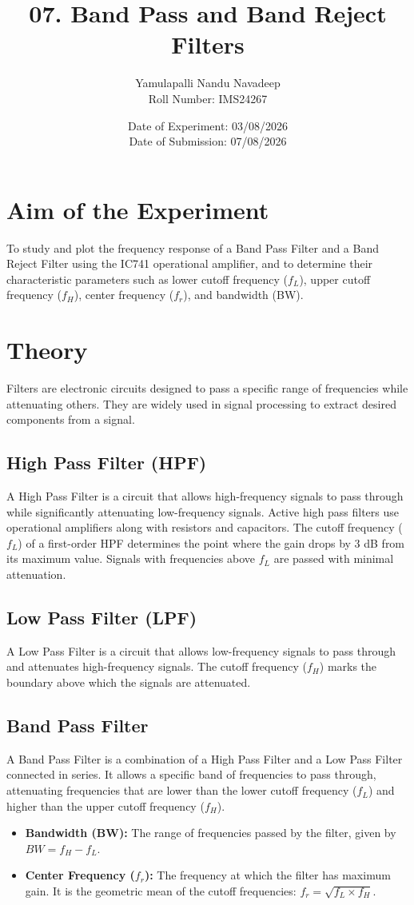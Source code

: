 \documentclass[12pt,a4paper]{article}
\title{\textbf{07. Band Pass and Band Reject Filters}}
\author{Yamulapalli Nandu Navadeep \\ Roll Number: IMS24267}
\date{Date of Experiment: 03/08/2026 \\ Date of Submission: 07/08/2026}
\begin{document}
\maketitle

\section{Aim of the Experiment}
To study and plot the frequency response of a Band Pass Filter and a Band Reject Filter using the IC741 operational amplifier, and to determine their characteristic parameters such as lower cutoff frequency ($f_L$), upper cutoff frequency ($f_H$), center frequency ($f_r$), and bandwidth (BW).

\section{Theory}
Filters are electronic circuits designed to pass a specific range of frequencies while attenuating others. They are widely used in signal processing to extract desired components from a signal.

\subsection{High Pass Filter (HPF)}
A High Pass Filter is a circuit that allows high-frequency signals to pass through while significantly attenuating low-frequency signals. Active high pass filters use operational amplifiers along with resistors and capacitors. The cutoff frequency ($f_L$) of a first-order HPF determines the point where the gain drops by 3 dB from its maximum value. Signals with frequencies above $f_L$ are passed with minimal attenuation.

\subsection{Low Pass Filter (LPF)}
A Low Pass Filter is a circuit that allows low-frequency signals to pass through and attenuates high-frequency signals. The cutoff frequency ($f_H$) marks the boundary above which the signals are attenuated. 

\subsection{Band Pass Filter}
A Band Pass Filter is a combination of a High Pass Filter and a Low Pass Filter connected in series. It allows a specific band of frequencies to pass through, attenuating frequencies that are lower than the lower cutoff frequency ($f_L$) and higher than the upper cutoff frequency ($f_H$).
\begin{itemize}
    \item \textbf{Bandwidth (BW):} The range of frequencies passed by the filter, given by $BW = f_H - f_L$.
    \item \textbf{Center Frequency ($f_r$):} The frequency at which the filter has maximum gain. It is the geometric mean of the cutoff frequencies: $f_r = \sqrt{f_L \times f_H}$.
\end{itemize}
\end{document}
